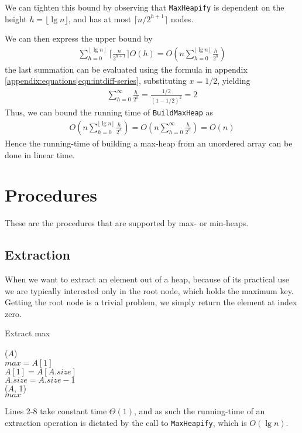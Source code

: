We can tighten this bound by observing that \texttt{MaxHeapify} is dependent
on the height $h = \lfloor \lg n \rfloor$, and has at most $\lceil n/2^{h+1}
\rceil$ nodes.

We can then express the upper bound by
\begin{align}
	\sum_{h=0}^{\left\lfloor \lg n \right\rfloor}
	\lceil \frac {n}{2^{h+1}} \rceil O(h) =
	O \left( n \sum_{h=0}^{\lfloor \lg n \rfloor} \frac{h}{2^h} \right)
\end{align}
the last summation can be evaluated using the formula in appendix
\ref{appendix:equations|eqn:intdiff-series}, substituting $x = 1/2$, yielding
\begin{align}
	\sum_{h=0}^{\infty} \frac{h}{2^h} = \frac{1/2}{(1 - 1/2)^2} = 2
\end{align}
Thus, we can bound the running time of \texttt{BuildMaxHeap} as
\begin{align}
	O \left( n \sum_{h=0}^{\lfloor \lg n \rfloor} \frac{h}{2^h} \right) =
	O \left( n \sum_{h=0}^{\infty} \frac{h}{2^h} \right) = O(n)
\end{align}
Hence the running-time of building a max-heap from an unordered array can be
done in linear time.

\newpage

\section{Procedures}
\label{ch:heaps|sec:procedures}
These are the procedures that are supported by max- or min-heaps.

\subsection{Extraction}
\label{ch:heaps|sec:procedures|sub:extraction}
When we want to extract an element out of a heap, because of its practical use
we are typically interested only in the root node, which holds the maximum
key. Getting the root node is a trivial problem, we simply return the element
at index zero. \\
\begin{algorithm}[H]
	\caption{Extract max}
	\label{alg:heap-extract-max}





	\BlankLine
	\ExtractMax($A$) \\
	\Begin
	{
		$max = A[1]$ \\
		$A[1] = A[A.size]$ \\
		$A.size = A.size - 1$ \\
		\MaxHeapify($A$, 1) \\
		\Return $max$
	}
\end{algorithm}
Lines 2-8 take constant time $\Theta(1)$, and as such the running-time of an
extraction operation is dictated by the call to \texttt{MaxHeapify}, which is
$O(\lg n)$.

